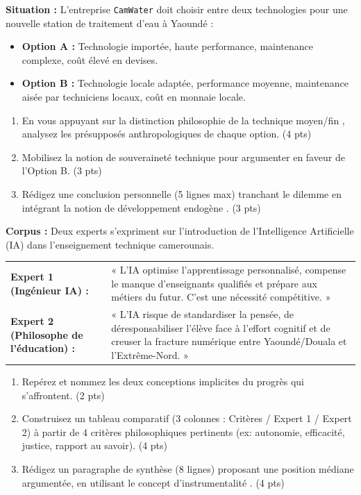 \documentclass[11pt]{article}
\begin{document}
\begin{exercice}
\textbf{Situation :} L'entreprise \texttt{CamWater} doit choisir entre deux technologies pour une nouvelle station de traitement d'eau à Yaoundé : 
\begin{itemize}
    \item \textbf{Option A :} Technologie importée, haute performance, maintenance complexe, coût élevé en devises.
    \item \textbf{Option B :} Technologie locale adaptée, performance moyenne, maintenance aisée par techniciens locaux, coût en monnaie locale.
\end{itemize}
\begin{enumerate}
    \item En vous appuyant sur la distinction philosophie de la technique \og moyen/fin \fg{}, analysez les présupposés anthropologiques de chaque option. (4 pts)
    \item Mobilisez la notion de \og souveraineté technique \fg{} pour argumenter en faveur de l'Option B. (3 pts)
    \item Rédigez une conclusion personnelle (5 lignes max) tranchant le dilemme en intégrant la notion de \og développement endogène \fg{}. (3 pts)
\end{enumerate}
\end{exercice}

\begin{exercice}
\textbf{Corpus :} Deux experts s'expriment sur l'introduction de l'Intelligence Artificielle (IA) dans l'enseignement technique camerounais.
\begin{tabularx}{\linewidth}{@{}lX@{}}
\textbf{Expert 1 (Ingénieur IA) :} & « L'IA optimise l'apprentissage personnalisé, compense le manque d'enseignants qualifiés et prépare aux métiers du futur. C'est une nécessité compétitive. » \\
\textbf{Expert 2 (Philosophe de l'éducation) :} & « L'IA risque de standardiser la pensée, de déresponsabiliser l'élève face à l'effort cognitif et de creuser la fracture numérique entre Yaoundé/Douala et l'Extrême-Nord. »
\end{tabularx}
\begin{enumerate}
    \item Repérez et nommez les deux conceptions implicites du \og progrès \fg{} qui s'affrontent. (2 pts)
    \item Construisez un tableau comparatif (3 colonnes : Critères / Expert 1 / Expert 2) à partir de 4 critères philosophiques pertinents (ex: autonomie, efficacité, justice, rapport au savoir). (4 pts)
    \item Rédigez un paragraphe de synthèse (8 lignes) proposant une position médiane argumentée, en utilisant le concept d'\og instrumentalité \fg{}. (4 pts)
\end{enumerate}
\end{exercice}
\end{document}
